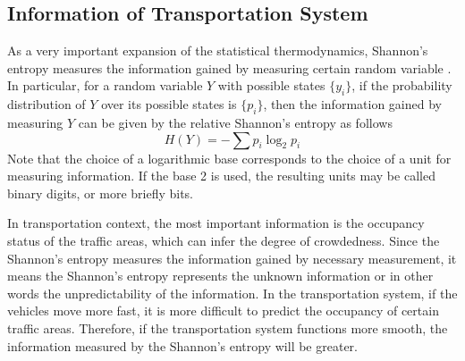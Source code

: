 \documentclass[preprint,authoryear,12pt]{elsarticle}
\begin{document}
\subsection{Information of Transportation System}

As a very important expansion of the statistical thermodynamics, Shannon's entropy measures the information gained by measuring certain random variable \citep{Shannon1948}. In particular, for a random variable $Y$ with possible states $\{y_i\}$, if the probability distribution of $Y$ over its possible states is $\{p_i\}$, then the information gained by measuring $Y$ can be given by the relative Shannon's entropy as follows
\begin{equation}\label{equ:shannon}
H(Y) = -\sum p_i \log_2 p_i
\end{equation}
Note that the choice of a logarithmic base corresponds to the choice of a unit for measuring information. If the base 2 is used, the resulting units may be called binary digits, or more briefly bits.

In transportation context, the most important information is the occupancy status of the traffic areas, which can infer the degree of crowdedness. Since the Shannon's entropy measures the information gained by necessary measurement, it means the Shannon's entropy represents the unknown information or in other words the unpredictability of the information. In the transportation system, if the vehicles move more fast, it is more difficult to predict the occupancy of certain traffic areas. Therefore, if the transportation system functions more smooth, the information measured by the Shannon's entropy will be greater.
\end{document}
